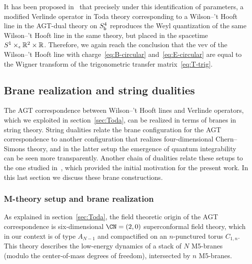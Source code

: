 It has been proposed in~\cite{Ito:2011ea} that precisely under this
identification of parameters, a modified Verlinde operator in Toda
theory corresponding to a Wilson--'t Hooft line in the AGT-dual theory
on $S^4_{\mathsf{b}}$ reproduces the Weyl quantization of the same Wilson--'t
Hooft line in the same theory, but placed in the spacetime
$S^1 \times_\epsilon \mathbb{R}^2 \times \mathbb{R}$.  Therefore, we again reach the
conclusion that the vev of the Wilson--'t Hooft line with
charge~\eqref{eq:B-circular} and~\eqref{eq:E-circular} are equal to
the Wigner transform of the trigonometric transfer
matrix~\eqref{eq:T-trig}.









\subsection{Brane realization and string dualities}
\label{sec:branes}

The AGT correspondence between Wilson--'t Hooft lines and Verlinde
operators, which we exploited in section~\ref{sec:Toda}, can be
realized in terms of branes in string theory.  String dualities relate
the brane configuration for the AGT correspondence to another
configuration that realizes four-dimensional Chern--Simons theory, and
in the latter setup the emergence of quantum integrability can be seen
more transparently.  Another chain of dualities relate these setups to
the one studied in~\cite{Maruyoshi:2016caf, Yagi:2017hmj}, which
provided the initial motivation for the present work.  In this last
section we discuss these brane constructions.





\subsubsection{M-theory setup and brane realization}

As explained in section~\ref{sec:Toda}, the field theoretic origin of
the AGT correspondence is six-dimensional $\CN = (2,0)$ superconformal
field theory, which in our context is of type $A_{N-1}$ and
compactified on an $n$-punctured torus $C_{1,n}$.  This theory
describes the low-energy dynamics of a stack of $N$ M5-branes (modulo
the center-of-mass degrees of freedom), intersected by $n$ M5-branes.


